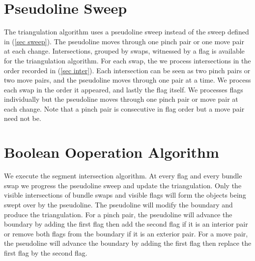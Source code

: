\documentclass[11pt]{article}
\begin{document}
\section{Pseudoline Sweep}
The triangulation algorithm uses a pseudoline sweep instead of the sweep defined in (\ref{sec sweep}).
The pseudoline moves through one pinch pair or one move pair at each change.
Intersections, grouped by swaps, witnessed by a flag is available for the triangulation algorithm.
For each swap, the we process intersections in the order recorded in (\ref{sec inter}).
Each intersection can be seen as two pinch pairs or two move pairs, and the pseudoline moves through one pair at a time.
We process each swap in the order it appeared, and lastly the flag itself.
We processes flags individually but the pseudoline moves through one pinch pair or move pair at each change.
Note that a pinch pair is consecutive in flag order but a move pair need not be.

\section{Boolean Ooperation Algorithm}
We execute the segment intersection algorithm.
At every flag and every bundle swap we progress the pseudoline sweep and update the triangulation.
Only the visible intersections of bundle swaps and visible flags will form the objects being swept over by the pseudoline.
The pseudoline will modify the boundary and produce the triangulation.
For a pinch pair, the pseudoline will advance the boundary by adding the first flag then add the second flag if it is an interior pair or remove both flags from the boundary if it is an exterior pair.
For a move pair, the pseudoline will advance the boundary by adding the first flag then replace the first flag by the second flag.
\end{document}
